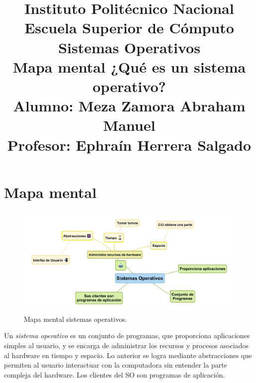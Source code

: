 \documentclass[a4paper,12pt]{article}
\begin{document}
\title{\Large Instituto Politécnico Nacional\\Escuela Superior de Cómputo\\Sistemas Operativos\\ Mapa mental ¿Qu\'e es un sistema operativo? \\Alumno: Meza Zamora Abraham Manuel\\Profesor: Ephra\'in Herrera Salgado}
\date{}
\maketitle

\section{Mapa mental} 
\begin{figure}[h]
\center
\includegraphics[scale=.75]{SistemasOperativos}
\caption{Mapa mental sistemas operativos.}
\end{figure}
\justify 
Un \textit{sistema operativo} es un conjunto de programas, que proporciona aplicaciones simples al usuario, y se encarga de administrar los recursos y procesos asociados al hardware en tiempo y espacio. Lo anterior se logra mediante abstracciones que permiten al usuario interactuar con la computadora sin entender la parte compleja del hardware. Los clientes del SO son programas de aplicación. 
\end{document}
